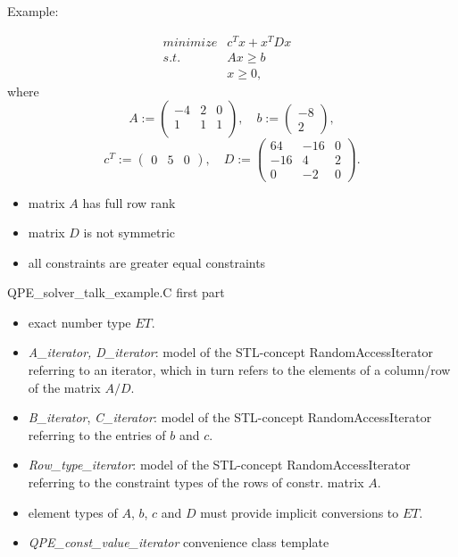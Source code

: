 \documentclass{slides}
\begin{document}
\begin{slide}
Example:

\begin{eqnarray*}
minimize & c^{T}x+x^{T}Dx & \\
s.t.     & Ax \geq b & \\
         & x \geq 0  ,&
\end{eqnarray*}
where
\[
A:=
\left(
\begin{array}{rrr}
-4 & 2 & 0 \\
1  & 1 & 1 \\
\end{array}
\right),
\quad
b:=
\left(
\begin{array}{r}
-8 \\
2
\end{array}
\right),
\]
\[
c^{T}:=
\left(
\begin{array}{rrr}
0 & 5 & 0
\end{array}
\right),
\quad
D:=
\left(
\begin{array}{rrr}
64  & -16 & 0 \\
-16 &   4 & 2 \\
0   &  -2 & 0 
\end{array}
\right).
\]
\end{slide}


\begin{note}
\begin{itemize}
\item  matrix $A$ has full row rank
\item  matrix $D$ is not symmetric
\item all constraints are greater equal constraints 
\end{itemize}
\end{note}

\begin{slide}
QPE\_solver\_talk\_example.C first part
\end{slide}

\begin{note}
\begin{itemize}
\item exact number type $ET$.
\item \emph{A\_iterator, D\_iterator}: model of the STL-concept
RandomAccessIterator referring to an iterator, which in turn refers to the
elements of a column/row of the matrix $A/D$.
\item \emph{B\_iterator}, \emph{C\_iterator}: model of the STL-concept
RandomAccessIterator referring to the entries of $b$ and $c$.
\item \emph{Row\_type\_iterator}: model of the STL-concept
RandomAccessIterator referring to the constraint types of the rows of constr.
matrix $A$.  
\item element types of $A$, $b$, $c$ and $D$ must provide implicit conversions
to $ET$.
\item \emph{QPE\_const\_value\_iterator} convenience class template
\end{itemize}
\end{note}
\end{document}
